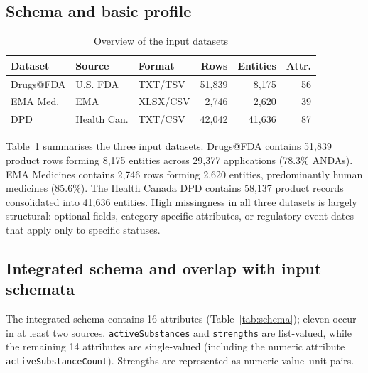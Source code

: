\documentclass[a4paper,oneside,bibliography=totoc]{scrbook}
\begin{document}
\subsection{Schema and basic profile}

\begin{table}[htbp]
\centering
\caption{Overview of the input datasets}
\label{tab:datasets}
\scriptsize
\setlength{\tabcolsep}{4pt}
\begin{tabular}{|l|l|l|r|r|r|}
\hline
\textbf{Dataset} & \textbf{Source} & \textbf{Format} & \textbf{Rows} & \textbf{Entities} & \textbf{Attr.} \\
\hline
Drugs@FDA  & U.S. FDA    & TXT/TSV  & 51,839 &  8,175 & 56 \\
EMA Med.   & EMA         & XLSX/CSV &  2,746 &  2,620 & 39 \\
DPD        & Health Can. & TXT/CSV  & 42,042 & 41,636 & 87 \\
\hline
\end{tabular}
\end{table}

Table~\ref{tab:datasets} summarises the three input datasets. Drugs@FDA contains 51,839 product rows forming 8,175 entities across 29,377 applications (78.3\% ANDAs). EMA Medicines contains 2,746 rows forming 2,620 entities, predominantly human medicines (85.6\%). The Health Canada DPD contains 58,137 product records consolidated into 41,636 entities. High missingness in all three datasets is largely structural: optional fields, category-specific attributes, or regulatory-event dates that apply only to specific statuses.

\subsection{Integrated schema and overlap with input schemata}

The integrated schema contains 16 attributes (Table~\ref{tab:schema}); eleven occur in at
least two sources. \texttt{activeSubstances} and \texttt{strengths} are list-valued, while
the remaining 14 attributes are single-valued (including the numeric attribute
\texttt{activeSubstanceCount}). Strengths are represented as numeric value--unit pairs.
\end{document}
